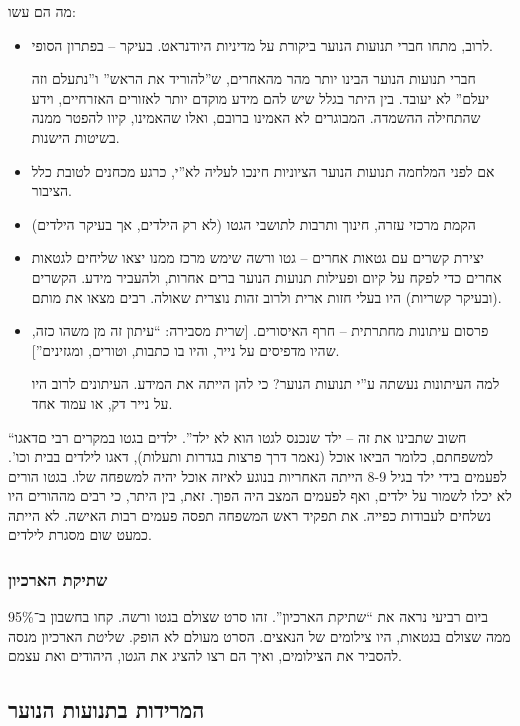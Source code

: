 \documentclass[a4paper]{book}
\begin{document}
	מה הם עשו: 
	\begin{itemize}
		\item לרוב, מתחו חברי תנועות הנוער ביקורת על מדיניות היודנראט. בעיקר – בפתרון הסופי. 
		
		חברי תנועות הנוער הבינו יותר מהר מהאחרים, ש''להוריד את הראש'' ו''נתעלם וזה יעלם'' לא יעובד. בין היתר בגלל שיש להם מידע מוקדם יותר לאזורים האזרחיים, וידע שהתחילה ההשמדה. המבוגרים לא האמינו ברובם, ואלו שהאמינו, קיוו להפטר ממנה בשיטות הישנות. 
		\item אם לפני המלחמה תנועות הנוער הציוניות חינכו לעליה לא''י, כרגע מכחנים לטובת כלל הציבור. 
		\item הקמת מרכזי עזרה, חינוך ותרבות לתושבי הגטו (לא רק הילדים, אך בעיקר הילדים)
		\item יצירת קשרים עם גטאות אחרים – גטו ורשה שימש מרכז ממנו יצאו שליחים לגטאות אחרים כדי לפקח על קיום ופעילות תנועות הנוער ברים אחרות, ולהעביר מידע. הקשרים (ובעיקר קשריות) היו בעלי חזות ארית ולרוב זהות נוצרית שאולה. רבים מצאו את מותם. 
		\item פרסום עיתונות מחתרתית – חרף האיסורים. [שרית מסבירה: ``עיתון זה מן משהו כזה, שהיו מדפיסים על נייר, והיו בו כתבות, וטורים, ומגזינים'']. 
		
		למה העיתונות נעשתה ע''י תנועות הנוער? כי להן הייתה את המידע. העיתונים לרוב היו על נייר דק, או עמוד אחד. 
	\end{itemize}
	
	``חשוב שתבינו את זה – ילד שנכנס לגטו הוא לא ילד''. ילדים בגטו במקרים רבי םדאגו למשפחתם, כלומר הביאו אוכל (נאמר דרך פרצות בגדרות ותעלות), דאגו לילדים בבית וכו'. לפעמים בידי ילד בגיל 8-9 הייתה האחריות בנוגע לאיזה אוכל יהיה למשפחה שלו. בגטו הורים לא יכלו לשמור על ילדים, ואף לפעמים המצב היה הפוך. זאת, בין היתר, כי רבים מההורים היו נשלחים לעבודות כפייה. את תפקיד ראש המשפחה תפסה פעמים רבות האישה. לא הייתה כמעט שום מסגרת לילדים. 
	
	\subsubsection{שתיקת הארכיון}
	
	ביום רביעי נראה את ``שתיקת הארכיון''. זהו סרט שצולם בגטו ורשה. קחו בחשבון ב־95\% ממה שצולם בגטאות, היו צילומים של הנאצים. הסרט מעולם לא הופק. שליטת הארכיון מנסה להסביר את הצילומים, ואיך הם רצו להציג את הגטו, היהודים ואת עצמם. 
	
	\subsection{המרידות בתנועות הנוער}
\end{document}
